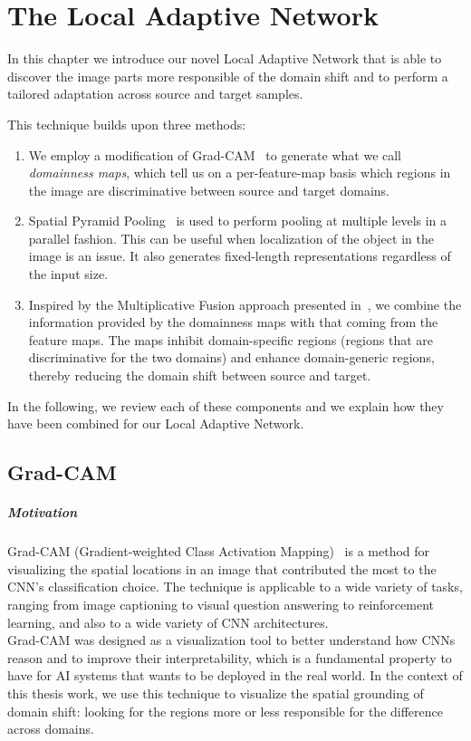 \documentclass[../main.tex]{subfiles}
\begin{document}
    \chapter{The Local Adaptive Network}\label{chap:loadnetwork}
    
    In this chapter we introduce our novel Local Adaptive Network that is able to
    discover the image parts more responsible of the domain shift and to perform a
    tailored adaptation across source and target samples.

    This technique builds upon three methods:
    \begin{enumerate}
        \item We employ a modification of Grad-CAM~\cite{gradcam} to generate what we call \textit{domainness maps},
            which tell us on a per-feature-map basis which regions in the image are discriminative between
            source and target domains.
        \item Spatial Pyramid Pooling~\cite{sppooling} is used to perform pooling at multiple levels in a parallel fashion.
            This can be useful when localization of the object in the image is an issue.
            It also generates fixed-length representations regardless of the input size.
        \item Inspired by the Multiplicative Fusion approach presented in~\cite{multfusion}, we combine the information
            provided by the domainness maps with that coming from the feature maps. The maps inhibit domain-specific regions
            (regions that are discriminative for the two domains) and enhance domain-generic regions, thereby reducing the
            domain shift between source and target.
    \end{enumerate}
    
    In the following, we review each of these components and we explain how they have been combined for our
    Local Adaptive Network.

    \section{Grad-CAM}

    \paragraph{Motivation}

    Grad-CAM (Gradient-weighted Class Activation Mapping)~\cite{gradcam} is a method for visualizing the spatial locations
    in an image that contributed the most to the CNN's classification choice.
    The technique is applicable to a wide variety of tasks, ranging from image captioning to visual question answering to
    reinforcement learning, and also to a wide variety of CNN architectures. \\
    Grad-CAM was designed as a visualization tool to better understand how CNNs reason and to improve
    their interpretability, which is a fundamental property to have for AI systems that wants to be deployed
    in the real world. In the context of this thesis work, we use this technique to visualize the spatial grounding of
    domain shift: looking for the regions more or less responsible for the difference across domains.
\end{document}
